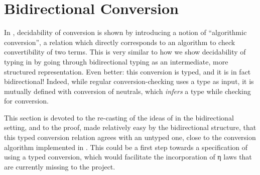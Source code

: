 \chapter{Bidirectional Conversion}
\label{chap:bidir-conv}

In , decidability of conversion is shown by introducing a notion
of “algorithmic conversion”, a relation which directly corresponds to an algorithm to
check convertibility of two terms. This is very similar to how we show decidability of typing
in  by going through bidirectional typing as an intermediate, more structured
representation.
Even better: this conversion is typed,%
and it is in fact bidirectional! Indeed, while regular conversion-checking uses a type as
input, it is mutually defined with conversion of neutrals, which \emph{infers} a type
while checking for conversion.

This section is devoted to the re-casting of the ideas of  in the
bidirectional setting, and to the proof, made relatively easy by the bidirectional structure,
that this typed conversion relation agrees with an untyped one, close to the conversion algorithm
implemented in . This could be a first step towards a specification of
 using a typed conversion, which would facilitate the incorporation of
η laws that are currently missing to the project.
